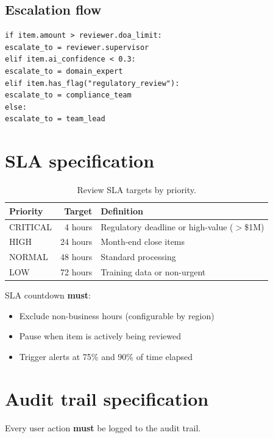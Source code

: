 \documentclass[11pt,a4paper,twoside]{report}
\begin{document}
\subsection{Escalation flow}

\begin{lstlisting}[basicstyle=\ttfamily\small,caption={Escalation routing rules.}]
if item.amount > reviewer.doa_limit:
escalate_to = reviewer.supervisor
elif item.ai_confidence < 0.3:
escalate_to = domain_expert
elif item.has_flag("regulatory_review"):
escalate_to = compliance_team
else:
escalate_to = team_lead
\end{lstlisting}

\section{SLA specification}

\begin{table}[htbp]
\centering
\caption{Review SLA targets by priority.}
\label{tab:review-sla}
\footnotesize
\begin{tabularx}{\linewidth}{@{}l r X@{}}
\toprule
\textbf{Priority} & \textbf{Target} & \textbf{Definition} \\ \midrule
CRITICAL & 4 hours & Regulatory deadline or high-value ($>$\$1M) \\
HIGH     & 24 hours & Month-end close items \\
NORMAL   & 48 hours & Standard processing \\
LOW      & 72 hours & Training data or non-urgent \\
\bottomrule
\end{tabularx}
\end{table}

SLA countdown \textbf{must}:
\begin{itemize}
\item Exclude non-business hours (configurable by region)
\item Pause when item is actively being reviewed
\item Trigger alerts at 75\% and 90\% of time elapsed
\end{itemize}

\section{Audit trail specification}\label{sec:dashboard-audit-trail}

Every user action \textbf{must} be logged to the audit trail.
\end{document}
